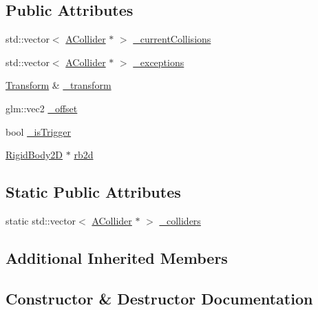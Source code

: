 \subsection*{Public Attributes}
\begin{DoxyCompactItemize}
\item 
std\+::vector$<$ \mbox{\hyperlink{class_beer_engine_1_1_component_1_1_a_collider}{A\+Collider}} $\ast$ $>$ \mbox{\hyperlink{class_beer_engine_1_1_component_1_1_a_collider_a5dafead72805d1f7c6c8862d7d4f4ec6}{\+\_\+current\+Collisions}}
\item 
std\+::vector$<$ \mbox{\hyperlink{class_beer_engine_1_1_component_1_1_a_collider}{A\+Collider}} $\ast$ $>$ \mbox{\hyperlink{class_beer_engine_1_1_component_1_1_a_collider_aace5686521db1fa1ace5d5d19b74753e}{\+\_\+exceptions}}
\item 
\mbox{\hyperlink{class_beer_engine_1_1_transform}{Transform}} \& \mbox{\hyperlink{class_beer_engine_1_1_component_1_1_a_collider_a4e4c356e177c7cfa07d36b76216dd993}{\+\_\+transform}}
\item 
glm\+::vec2 \mbox{\hyperlink{class_beer_engine_1_1_component_1_1_a_collider_ad2f3b26f5ed32861200fce17506925eb}{\+\_\+offset}}
\item 
bool \mbox{\hyperlink{class_beer_engine_1_1_component_1_1_a_collider_a078be3ddd4f135ffc5d5670aa855db58}{\+\_\+is\+Trigger}}
\item 
\mbox{\hyperlink{class_beer_engine_1_1_component_1_1_rigid_body2_d}{Rigid\+Body2D}} $\ast$ \mbox{\hyperlink{class_beer_engine_1_1_component_1_1_a_collider_aa3e90975f78f74ae4c0cd559b91725dc}{rb2d}}
\end{DoxyCompactItemize}
\subsection*{Static Public Attributes}
\begin{DoxyCompactItemize}
\item 
static std\+::vector$<$ \mbox{\hyperlink{class_beer_engine_1_1_component_1_1_a_collider}{A\+Collider}} $\ast$ $>$ \mbox{\hyperlink{class_beer_engine_1_1_component_1_1_a_collider_a6339bca4a10879ef05d14604f5e869c6}{\+\_\+colliders}}
\end{DoxyCompactItemize}
\subsection*{Additional Inherited Members}


\subsection{Constructor \& Destructor Documentation}
\mbox{\label{class_beer_engine_1_1_component_1_1_a_collider_a807a20c3c5c411d832d371523f02220c}} 
